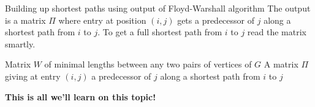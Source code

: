 \documentclass[32pt,aspectratio=169, handout]{beamer}
\begin{document}
\begin{frame}{Building up shortest paths using output of Floyd-Warshall algorithm}
  The output is a matrix $\Pi$ where entry at position $(i, j)$ gets a
  predecessor of $j$ along a shortest path from $i$ to $j$. To get a
  full shortest path from $i$ to $j$ read the matrix smartly.

  \vspace{.3\baselineskip}
    \small{
      \begin{algorithmic}[1]
        \Require Matrix $W$ of minimal lengths between any two pairs of vertices of $G$
        \Ensure A matrix $\Pi$ giving at entry $(i, j)$ a predecessor of
        $j$ along a shortest path from $i$ to $j$
        \EndIf
        \EndFor
        \EndFor
        \EndFor
        \State{\Return{$\Pi$}}
      \end{algorithmic}
    }
\end{frame}

\begin{frame}
  \centering
  \Large \textbf{This is all we'll learn on this topic!}
\end{frame}

\end{document}
